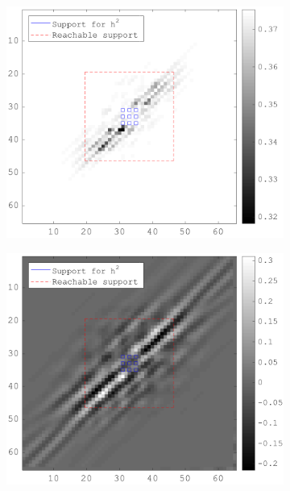 \begin{figure}[!h]
\begin{subfigure}[b]{0.49\textwidth}
\end{subfigure}
   \begin{subfigure}[b]{0.49\textwidth}\centering
    \includegraphics[width=\textwidth]{figures/xp/xp_128x128_sc2_angl1_K3_S3_node2_obj_matrix.png}
    \end{subfigure}
    \begin{subfigure}[b]{0.49\textwidth}\centering
    \includegraphics[width=\textwidth]{figures/xp/xp_128x128_sc2_angl1_K3_S3_node2_gradient_node_2.png}
    \end{subfigure}
\end{figure}


